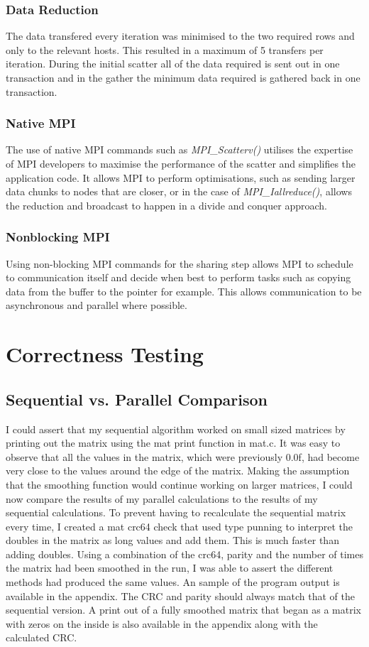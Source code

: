 \documentclass[a4paper,10pt]{report}
\begin{document}
\subsubsection{Data Reduction}
The data transfered every iteration was minimised to the two required rows and only to the relevant hosts. This resulted in a maximum of 5 transfers per iteration. During the initial scatter all of the data required is sent out in one transaction and in the gather the minimum data required is gathered back in one transaction.
\subsubsection{Native MPI}
The use of native MPI commands such as \emph{MPI\_Scatterv()} utilises the expertise of MPI developers to maximise the performance of the scatter and simplifies the application code. It allows MPI to perform optimisations, such as sending larger data chunks to nodes that are closer, or in the case of \emph{MPI\_Iallreduce()}, allows the reduction and broadcast to happen in a divide and conquer approach.
\subsubsection{Nonblocking MPI}
Using non-blocking MPI commands for the sharing step allows MPI to schedule to communication itself and decide when best to perform tasks such as copying data from the buffer to the pointer for example. This allows communication to be asynchronous and parallel where possible.

\section{Correctness Testing}
\subsection{Sequential vs. Parallel Comparison}
I could assert that my sequential algorithm worked on small sized matrices by printing out the matrix using the mat print function in mat.c. It was easy to observe that all the values in the matrix, which were previously 0.0f, had become very close to the values around the edge of the matrix. Making the assumption that the smoothing function would continue working on larger matrices, I could now compare the results of my parallel calculations to the results of my sequential calculations. To prevent having to recalculate the sequential matrix every time, I created a mat crc64 check that used type punning to interpret the doubles in the matrix as long values and add them. This is much faster than adding doubles. Using a combination of the crc64, parity and the number of times the matrix had been smoothed in the run, I was able to assert the different methods had produced the same values. An sample of the program output is available in the appendix. The CRC and parity should always match that of the sequential version. A print out of a fully smoothed matrix that began as a matrix with zeros on the inside is also available in the appendix along with the calculated CRC.
\end{document}
